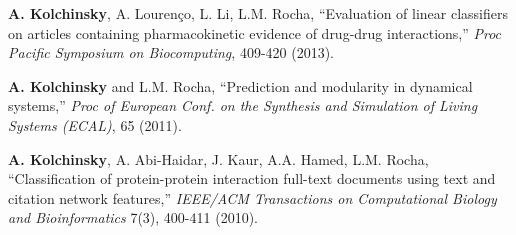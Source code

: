 \textbf{A. Kolchinsky}, A. Lourenço, L. Li, L.M. Rocha, ``Evaluation of linear classifiers on articles containing pharmacokinetic evidence of drug-drug interactions,'' \emph{Proc Pacific Symposium on Biocomputing}, 409-420 (2013).  

\textbf{A. Kolchinsky} and L.M. Rocha, ``Prediction and modularity in dynamical systems,'' \emph{Proc of European Conf. on the Synthesis and Simulation of Living Systems (ECAL)}, 65 (2011).  

\textbf{A. Kolchinsky}, A. Abi-Haidar, J. Kaur, A.A. Hamed, L.M. Rocha, ``Classification of protein-protein interaction full-text documents using text and citation network features,'' \emph{IEEE/ACM Transactions on Computational Biology and Bioinformatics} 7(3), 400-411 (2010). 
 
